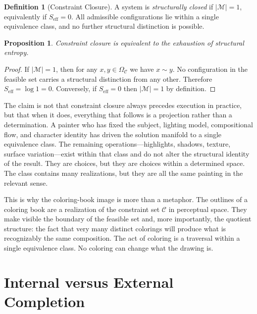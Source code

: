\documentclass[12pt, twoside]{article}
\theoremstyle{plain}
\newtheorem{proposition}[theorem]{Proposition}
\theoremstyle{definition}
\newtheorem{definition}[theorem]{Definition}
\theoremstyle{remark}
\newcommand{\OmC}{\Omega_{\mathcal{C}}}
\newcommand{\Seff}{S_{\text{eff}}}
\begin{document}
\begin{definition}[Constraint Closure]
\label{def:closure}
A system is \emph{structurally closed} if $|\mathcal{M}| = 1$, equivalently if $\Seff = 0$. All admissible configurations lie within a single equivalence class, and no further structural distinction is possible.
\end{definition}

\begin{proposition}
\label{prop:closure-entropy}
Constraint closure is equivalent to the exhaustion of structural entropy.
\end{proposition}

\begin{proof}
If $|\mathcal{M}| = 1$, then for any $x, y \in \OmC$ we have $x \sim y$. No configuration in the feasible set carries a structural distinction from any other. Therefore $\Seff = \log 1 = 0$. Conversely, if $\Seff = 0$ then $|\mathcal{M}| = 1$ by definition.
\end{proof}

The claim is not that constraint closure always precedes execution in practice, but that when it does, everything that follows is a projection rather than a determination. A painter who has fixed the subject, lighting model, compositional flow, and character identity has driven the solution manifold to a single equivalence class. The remaining operations---highlights, shadows, texture, surface variation---exist within that class and do not alter the structural identity of the result. They are choices, but they are choices within a determined space. The class contains many realizations, but they are all the same painting in the relevant sense.

This is why the coloring-book image is more than a metaphor. The outlines of a coloring book are a realization of the constraint set $\mathcal{C}$ in perceptual space. They make visible the boundary of the feasible set and, more importantly, the quotient structure: the fact that very many distinct colorings will produce what is recognizably the same composition. The act of coloring is a traversal within a single equivalence class. No coloring can change what the drawing is.

\section{Internal versus External Completion}
\label{sec:internal-external}
\end{document}

